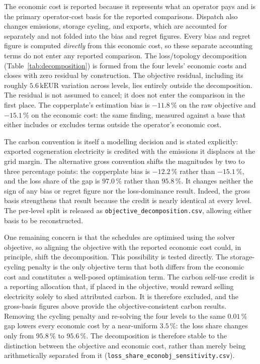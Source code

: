 The economic cost is reported because it represents what an operator pays and is the primary
operator-cost basis for the reported comparisons. Dispatch also changes emissions, storage
cycling, and exports, which are accounted for separately and not folded into the bias and regret
figures. Every bias and regret figure is computed \emph{directly} from this economic cost, so
these separate accounting terms do not enter any reported comparison. The loss/topology
decomposition (Table~\ref{tab:decomposition}) is formed from the four levels' economic costs and
closes with zero residual by construction. The objective residual, including its roughly
\(5.6\,\mathrm{kEUR}\) variation across levels, lies entirely outside the decomposition. The
residual is not assumed to cancel; it does not enter the comparison in the first place. The
copperplate's estimation bias is \(-11.8\,\%\) on the raw objective and
\(\mathbf{-15.1}\,\%\) on the economic cost: the same finding, measured against a base that
either includes or excludes terms outside the operator's economic cost.

The carbon convention is itself a modelling decision and is stated explicitly: exported
cogeneration electricity is credited with the emissions it displaces at the grid margin. The
alternative gross convention shifts the magnitudes by two to three percentage points: the
copperplate bias is \(-12.2\,\%\) rather than \(-15.1\,\%\), and the loss share of the gap is
\(97.0\,\%\) rather than \(95.8\,\%\). It changes neither the sign of any bias or regret figure
nor the loss-dominance result. Indeed, the gross basis strengthens that result because the
credit is nearly identical at every level. The per-level split is released as
\texttt{objective\_decomposition.csv}, allowing either basis to be reconstructed.

One remaining concern is that the schedules are optimised using the solver objective, so
aligning the objective with the reported economic cost could, in principle, shift the
decomposition. This possibility is tested directly. The storage-cycling penalty is the only
objective term that both differs from the economic cost and constitutes a well-posed
optimisation term. The carbon self-use credit is a reporting allocation that, if placed in the
objective, would reward selling electricity solely to shed attributed carbon. It is therefore
excluded, and the gross-basis figures above provide the objective-consistent carbon results.
Removing the cycling penalty and re-solving the four levels to the same \(0.01\,\%\) gap lowers
every economic cost by a near-uniform \(3.5\,\%\): the loss share changes only from \(95.8\,\%\)
to \(95.6\,\%\). The decomposition is therefore stable to the distinction between the objective
and economic cost, rather than merely being arithmetically separated from it
(\texttt{loss\_share\_econobj\_sensitivity.csv}).
